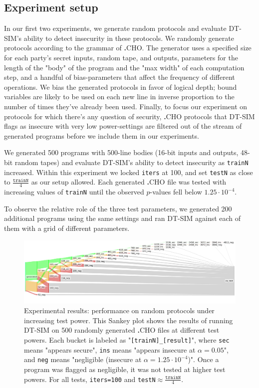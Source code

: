 \documentclass[acmlarge, manuscript, screen, review, anonymous, table]{acmart}
\newcommand{\langname}{\textsc{\textbf{.}CHO}\xspace}
\newcommand{\toolname}{\textsc{DT-SIM}\xspace}
\begin{document}
\subsection{Experiment setup}
In our first two experiments, we generate random protocols and evaluate \toolname's ability to detect insecurity in these protocols.
We randomly generate protocols according to the grammar of \langname.
The generator uses a specified size for each party's secret inputs, random tape, and outputs,
parameters for the length of the "body" of the program and the "max width" of each computation step,
and a handful of bias-parameters that affect the frequency of different operations.
We bias the generated protocols in favor of logical depth;
bound variables are likely
to be used on each new line in inverse proportion to the number of times they've already been used.
Finally, to focus our experiment on protocols for which there's any question of security,
\langname protocols that \toolname flags as insecure with very low power-settings
are filtered out of the stream of generated programs before we include them in our experiments.

We generated 500 programs with 500-line bodies (16-bit inputs and outputs, 48-bit random tapes)
and evaluate \toolname's ability to detect insecurity as \texttt{trainN} increased.
Within this experiment we locked \texttt{iters} at 100, and set \texttt{testN} as close to $\frac{\mathtt{trainN}}{4}$ as our setup allowed.
Each generated \langname file was tested with increasing values of \texttt{trainN} until the observed $p$-values fell below $1.25 \cdot 10^{-4}$.

To observe the relative role of the three test parameters, we generated 200 additional programs using the same settings
and ran \toolname against each of them with a grid of different parameters.

\begin{figure}[tbhp]
  \newcommand{\gsize}{.9\textwidth}
  \includegraphics[width=\gsize]{graphs/medium2.old.pdf}
  \caption{Experimental results: performance on random protocols under increasing test power.
    This Sankey plot shows the results of running \toolname on 500 randomly generated \langname files at different test powers.
    Each bucket is labeled as "\texttt{[trainN]\_[result]}", where \texttt{sec} means "appears secure",
    \texttt{ins} means "appears insecure at $\alpha=0.05$",
    and \texttt{neg} means "negligible (insecure at $\alpha=1.25 \cdot 10^{-4}$)".
    Once a program was flagged as negligible, it was not tested at higher test powers.
    For all tests, \texttt{iters=100} and \texttt{testN$\approx\!\!\frac{\mathtt{trainN}}{4}$}.
    }
  \label{fig:sankey}
\end{figure}
\end{document}
